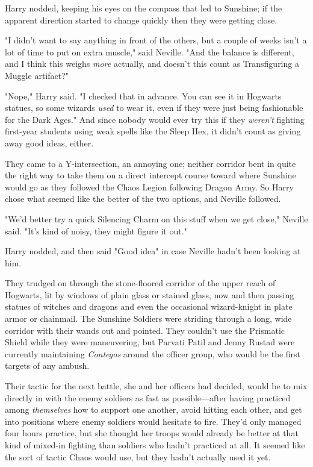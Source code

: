 Harry nodded, keeping his eyes on the compass that led to Sunshine; if the
apparent direction started to change quickly then they were getting close.

"I didn't want to say anything in front of the others, but a couple of weeks
isn't a lot of time to put on extra muscle," said Neville. "And the balance is
different, and I think this weighs \emph{more} actually, and doesn't this count
as Transfiguring a Muggle artifact?"

"Nope," Harry said. "I checked that in advance. You can see it in Hogwarts
statues, so some wizards \emph{used} to wear it, even if they were just being
fashionable for the Dark Ages." And since nobody would ever try this if they
\emph{weren't} fighting first-year students using weak spells like the Sleep
Hex, it didn't count as giving away good ideas, either.

They came to a Y-intersection, an annoying one; neither corridor bent in quite
the right way to take them on a direct intercept course toward where Sunshine
would go as they followed the Chaos Legion following Dragon Army. So Harry
chose what seemed like the better of the two options, and Neville followed.

"We'd better try a quick Silencing Charm on this stuff when we get close,"
Neville said. "It's kind of noisy, they might figure it out."

Harry nodded, and then said "Good idea" in case Neville hadn't been looking at
him.

They trudged on through the stone-floored corridor of the upper reach of
Hogwarts, lit by windows of plain glass or stained glass, now and then passing
statues of witches and dragons and even the occasional wizard-knight in plate
armor or chainmail.
\later
The Sunshine Soldiers were striding through a long, wide corridor with their
wands out and pointed. They couldn't use the Prismatic Shield while they were
maneuvering, but Parvati Patil and Jenny Rustad were currently maintaining
\emph{Contegos} around the officer group, who would be the first targets of any
ambush.

Their tactic for the next battle, she and her officers had decided, would be to
mix directly in with the enemy soldiers as fast as possible---after having
practiced among \emph{themselves} how to support one another, avoid hitting
each other, and get into positions where enemy soldiers would hesitate to fire.
They'd only managed four hours practice, but she thought her troops would
already be better at that kind of mixed-in fighting than soldiers who hadn't
practiced at all. It seemed like the sort of tactic Chaos would use, but they
hadn't actually used it yet.

